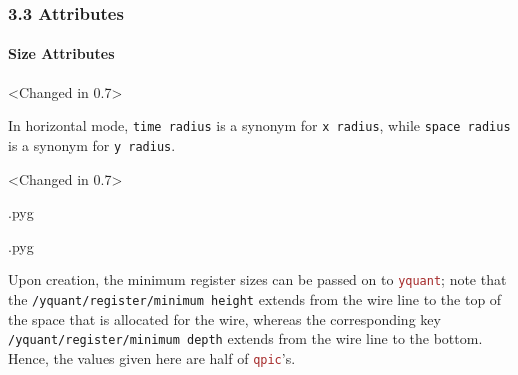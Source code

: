 \documentclass{scrartcl}
\makeatletter
\newenvironment{codeexample}{%
   \VerbatimEnvironment%
   \let\FVB@VerbatimOut\minted@FVB@VerbatimOut
   \let\FVE@VerbatimOut\minted@FVE@VerbatimOut
   \minted@configlang{tex}%
   \minted@fvset
   \begin{VerbatimOut}[codes={\catcode`\^^I=12},firstline,lastline]{\minted@jobname.pyg}%
}{
   \end{VerbatimOut}%
   \minted@langlinenoson%
   \savebox\codeexamplebox{ \minted@jobname.pyg}%
   \ifdim\wd\codeexamplebox>\dimexpr.5\linewidth-3mm\relax%
      \wd\codeexamplebox=.5\linewidth%
   \else%
      \wd\codeexamplebox=\dimexpr\wd\codeexamplebox+3mm\relax%
   \fi%
   \noindent\begin{minipage}{\wd\codeexamplebox}%
      \centering%
      \usebox\codeexamplebox%
   \end{minipage}%
   \begin{minipage}{\dimexpr\linewidth-\wd\codeexamplebox\relax}%
      \expandafter\minted@pygmentize\expandafter{\minted@lang}%
   \end{minipage}%
   \minted@langlinenosoff%
   \par%
}
\newenvironment{codeexample*}{%
   \VerbatimEnvironment%
   \let\FVB@VerbatimOut\minted@FVB@VerbatimOut
   \let\FVE@VerbatimOut\minted@FVE@VerbatimOut
   \minted@configlang{tex}%
   \minted@fvset
   \begin{VerbatimOut}[codes={\catcode`\^^I=12},firstline,lastline]{\minted@jobname.pyg}%
}{
   \end{VerbatimOut}%
   \minted@langlinenoson%
   \begin{adjustbox}{center}
       \minted@jobname.pyg %
   \end{adjustbox}\nopagebreak
   \expandafter\minted@pygmentize\expandafter{\minted@lang}%
   \minted@langlinenosoff%
   \par%
}
\def\pkg#1{\textcolor{brown}{\texttt{#1}}}
\def\ttlink{\link\texttt}
\def\Yquant{\pkg{yquant}}
\makeatother
\begin{document}
         \subsubsection{3.3 Attributes}
            \paragraph{Size Attributes}
               \begin{example}<Changed in 0.7>
                  \begin{codeexample*}
                  \end{codeexample*}
                  In horizontal mode, \texttt{time radius} is a synonym for \texttt{x radius}, while \texttt{space radius} is a synonym for \texttt{y radius}.
               \end{example}

               \begin{example}<Changed in 0.7>
                  \begin{codeexample}
                  \end{codeexample}
               \end{example}

               \begin{example}
                  \begin{codeexample}
                  \end{codeexample}
                  Upon creation, the minimum register sizes can be passed on to \Yquant; note that the \ttlink{/yquant/register/minimum height} extends from the wire line to the top of the space that is allocated for the wire, whereas the corresponding key \ttlink{/yquant/register/minimum depth} extends from the wire line to the bottom.
                  Hence, the values given here are half of \pkg{qpic}'s.
               \end{example}
\end{document}

